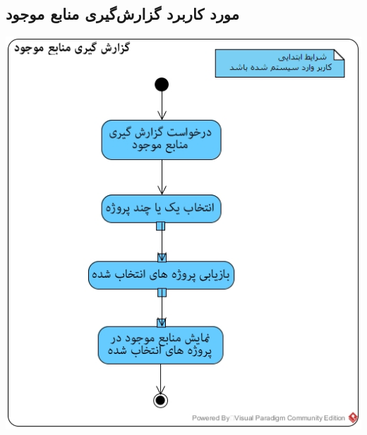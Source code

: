 \subsection*{مورد کاربرد گزارش‌گیری منابع موجود}
\vspace{2cm}
\begin{center}
\includegraphics[width=\textwidth]{ActivityDiagrams/40.jpg}
\end{center}

\newpage
\vspace{2cm}
